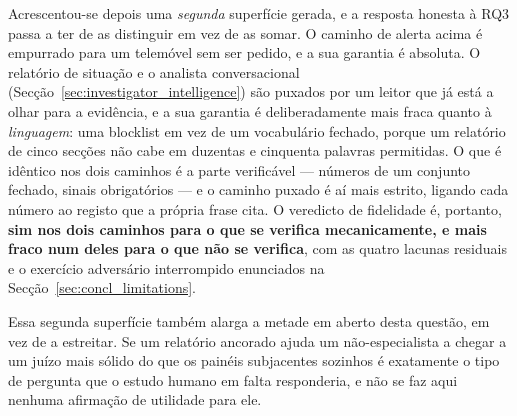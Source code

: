 Acrescentou-se depois uma \emph{segunda} superfície gerada, e a resposta honesta à RQ3 passa a ter de
as distinguir em vez de as somar. O caminho de alerta acima é empurrado para um telemóvel sem ser
pedido, e a sua garantia é absoluta. O relatório de situação e o analista conversacional
(Secção~\ref{sec:investigator_intelligence}) são puxados por um leitor que já está a olhar para a
evidência, e a sua garantia é deliberadamente mais fraca quanto à \emph{linguagem}: uma blocklist em
vez de um vocabulário fechado, porque um relatório de cinco secções não cabe em duzentas e cinquenta
palavras permitidas. O que é idêntico nos dois caminhos é a parte verificável --- números de um
conjunto fechado, sinais obrigatórios --- e o caminho puxado é aí mais estrito, ligando cada número
ao registo que a própria frase cita. O veredicto de fidelidade é, portanto, \textbf{sim nos dois
caminhos para o que se verifica mecanicamente, e mais fraco num deles para o que não se verifica},
com as quatro lacunas residuais e o exercício adversário interrompido enunciados na
Secção~\ref{sec:concl_limitations}.

Essa segunda superfície também alarga a metade em aberto desta questão, em vez de a estreitar. Se um
relatório ancorado ajuda um não-especialista a chegar a um juízo mais sólido do que os painéis
subjacentes sozinhos é exatamente o tipo de pergunta que o estudo humano em falta responderia, e não
se faz aqui nenhuma afirmação de utilidade para ele.

